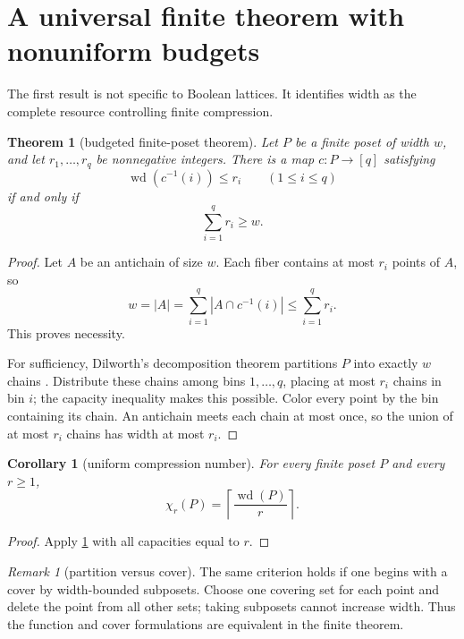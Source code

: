 \documentclass[11pt,letterpaper]{article}
\numberwithin{equation}{section}
\theoremstyle{plain}
\newtheorem{theorem}{Theorem}[section]
\newtheorem{corollary}[corollary]{Corollary}
\theoremstyle{definition}
\theoremstyle{remark}
\newtheorem{remark}[remark]{Remark}
\newcommand{\pwidth}{\operatorname{wd}}
\begin{document}
\section{A universal finite theorem with nonuniform budgets}\label{bwc:sec:finiteposets}

The first result is not specific to Boolean lattices.  It identifies width as
the complete resource controlling finite compression.

\begin{theorem}[budgeted finite-poset theorem]\label{bwc:thm:budget}
Let $P$ be a finite poset of width $w$, and let $r_1,\dots,r_q$ be
nonnegative integers.  There is a map $c:P\to[q]$ satisfying
\[
       \pwidth(c^{-1}(i))\leq r_i\qquad(1\leq i\leq q)
\]
if and only if
\[
       \sum_{i=1}^q r_i\geq w.
\]
\end{theorem}

\begin{proof}
Let $A$ be an antichain of size $w$.  Each fiber contains at most $r_i$
points of $A$, so
\[
 w=|A|=\sum_{i=1}^q |A\cap c^{-1}(i)|\leq\sum_{i=1}^q r_i.
\]
This proves necessity.

For sufficiency, Dilworth's decomposition theorem partitions $P$ into exactly
$w$ chains \cite{Dilworth1950}.  Distribute these chains among bins
$1,\dots,q$, placing at most $r_i$ chains in bin $i$; the capacity inequality
makes this possible.  Color every point by the bin containing its chain.  An
antichain meets each chain at most once, so the union of at most $r_i$ chains
has width at most $r_i$.
\end{proof}

\begin{corollary}[uniform compression number]\label{bwc:cor:uniform}
For every finite poset $P$ and every $r\geq1$,
\[
              \chi_r(P)=\left\lceil\frac{\pwidth(P)}r\right\rceil.
\]
\end{corollary}

\begin{proof}
Apply \cref{bwc:thm:budget} with all capacities equal to $r$.
\end{proof}

\begin{remark}[partition versus cover]\label{bwc:rem:cover}
The same criterion holds if one begins with a cover by width-bounded
subposets.  Choose one covering set for each point and delete the point from
all other sets; taking subposets cannot increase width.  Thus the function
and cover formulations are equivalent in the finite theorem.
\end{remark}
\end{document}
